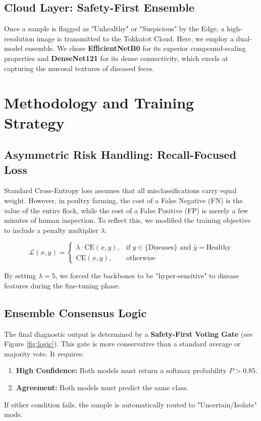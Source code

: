 \documentclass[12pt,a4paper]{article}
\begin{document}
\subsection{Cloud Layer: Safety-First Ensemble}
Once a sample is flagged as "Unhealthy" or "Suspicious" by the Edge, a high-resolution image is transmitted to the Tokkatot Cloud. Here, we employ a dual-model ensemble. We chose \textbf{EfficientNetB0} \cite{tan2019efficientnet} for its superior compound-scaling properties and \textbf{DenseNet121} \cite{huang2017densely} for its dense connectivity, which excels at capturing the mucosal textures of diseased feces. 

\section{Methodology and Training Strategy}

\subsection{Asymmetric Risk Handling: Recall-Focused Loss}
Standard Cross-Entropy loss assumes that all misclassifications carry equal weight. However, in poultry farming, the cost of a False Negative (FN) is the value of the entire flock, while the cost of a False Positive (FP) is merely a few minutes of human inspection. To reflect this, we modified the training objective to include a penalty multiplier $\lambda$:

\begin{equation}
\mathcal{L}(x, y) = 
\begin{cases} 
\lambda \cdot \text{CE}(x, y), & \text{if } y \in \{\text{Diseases}\} \text{ and } \hat{y} = \text{Healthy} \\
\text{CE}(x, y), & \text{otherwise}
\end{cases}
\end{equation}

By setting $\lambda=5$, we forced the backbones to be "hyper-sensitive" to disease features during the fine-tuning phase.

\subsection{Ensemble Consensus Logic}
The final diagnostic output is determined by a \textbf{Safety-First Voting Gate} (see Figure \ref{fig:logic}). This gate is more conservative than a standard average or majority vote. It requires:
\begin{enumerate}
    \item \textbf{High Confidence:} Both models must return a softmax probability $P > 0.85$.
    \item \textbf{Agreement:} Both models must predict the same class.
\end{enumerate}
If either condition fails, the sample is automatically routed to "Uncertain/Isolate" mode.
\end{document}
